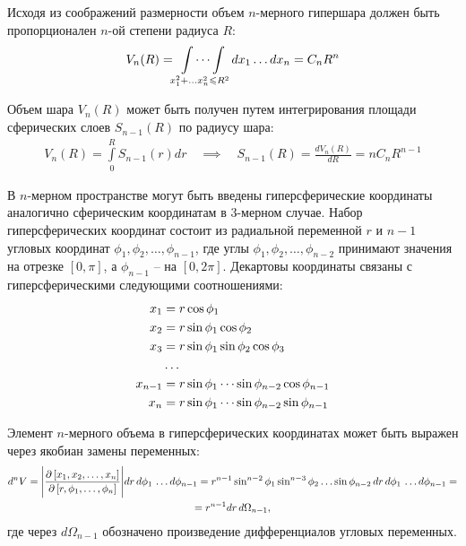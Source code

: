 Исходя из соображений размерности объем $n$-мерного гипершара должен быть пропорционален $n$-ой степени радиуса $R$:
\vverh
\begin{gather}
	V_n (R) = \idotsint\limits_{x_1^2 + \dots x_n^2 \leqslant R^2} dx_1 \dots dx_n = C_n R^n \label{int1}
\end{gather}

Объем шара $V_n(R)$ может быть получен путем интегрирования площади сферических слоев $S_{n-1}(R)$ по радиусу шара:
\vverh
\begin{gather}
	V_n(R) = \int\limits_{0}^{R} S_{n-1}(r) dr \quad \implies \quad S_{n-1}(R) = \frac{d V_n(R)}{dR} = nC_n R^{n-1} \label{surf1} 
\end{gather}

В $n$-мерном пространстве могут быть введены гиперсферические координаты аналогично сферическим координатам в 3-мерном случае. Набор гиперсферических координат состоит из радиальной переменной $r$ и $n-1$ угловых координат $\phi_1,\phi_2, \dots ,\phi_{n-1}$, где углы $\phi_1, \phi_2, \dots, \phi_{n-2}$ принимают значения на отрезке $\left[ 0, \pi \right]$, а $\phi_{n-1}$ -- на $\left[ 0, 2 \pi \right]$. Декартовы координаты связаны с гиперсферическими следующими соотношениями:
\vverh
\begin{gather}
\begin{aligned}
x_1 &= r \cos \phi_1 \\
x_2 &= r \sin \phi_1 \cos \phi_2 \\
x_3 &= r \sin \phi_1 \sin \phi_2 \cos \phi_3 \\
&\dots \\
x_{n-1} &= r \sin \phi_1 \cdots \sin \phi_{n-2} \cos \phi_{n-1} \\
x_n &= r \sin \phi_1 \cdots \sin \phi_{n-2} \sin \phi_{n-1}
\end{aligned} \notag
\end{gather}

Элемент $n$-мерного объема в гиперсферических координатах может быть выражен через якобиан замены переменных:
\vverh
\begin{gather}
	d^n V = \Bigg{|} \frac{\partial \left[ x_1, x_2, \dots, x_n \right]}{\partial \left[ r, \phi_1, \dots, \phi_n \right]} \Bigg{|} d r \, d \phi_1 \, \dots d \phi_{n-1} = r^{n-1} \sin^{n-2} \phi_1 \sin^{n-3} \phi_2 \dots \sin \phi_{n-2} \, d r \, d \phi_1\, \dots d \phi_{n-1} = \notag \\
= r^{n-1} dr \, d \Omega_{n-1}, \notag
\end{gather} 
где через $d \Omega_{n-1}$ обозначено произведение дифференциалов угловых переменных. \par

